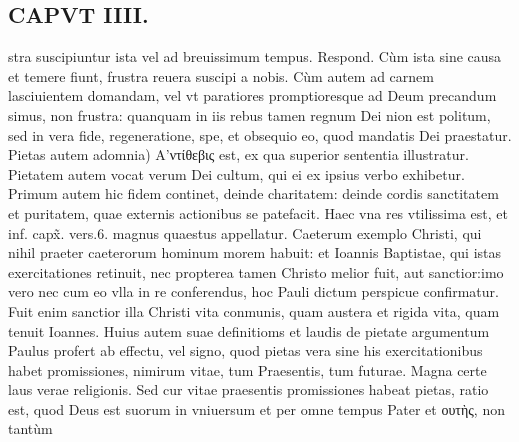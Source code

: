 \documentclass{article}
\begin{document}
\begin{pages}
\section*{CAPVT  IIII. }
\marginpar{[ p.211 ]}\pstart stra suscipiuntur ista vel ad breuissimum tempus. Respond. Cùm ista sine causa et temere fiunt, frustra reuera suscipi a nobis. Cùm autem ad carnem lasciuientem domandam, vel vt paratiores promptioresque ad Deum precandum simus, non frustra: quanquam in iis rebus tamen regnum Dei nion est politum, sed in vera fide, regeneratione, spe, et obsequio eo, quod mandatis Dei praestatur.  \pend\pstart Pietas autem adomnia) Α'ντίθεβις est, ex qua superior sententia illustratur. Pietatem autem vocat verum Dei cultum, qui ei ex ipsius verbo exhibetur. Primum autem hic fidem continet, deinde charitatem: deinde cordis sanctitatem et puritatem, quae externis actionibus se patefacit. Haec vna res vtilissima est, et inf. capx̃. vers.6. magnus quaestus appellatur. Caeterum exemplo Christi, qui nihil praeter caeterorum hominum morem habuit: et Ioannis Baptistae, qui istas exercitationes retinuit, nec propterea tamen Christo melior fuit, aut sanctior:imo vero nec cum eo vlla in re conferendus, hoc Pauli dictum perspicue confirmatur. Fuit enim sanctior illa Christi vita conmunis, quam austera et rigida vita, quam tenuit Ioannes.  \pend\pstart Huius autem suae definitioms et laudis de pietate argumentum Paulus profert ab effectu, vel signo, quod pietas vera sine his exercitationibus habet promissiones, nimirum vitae, tum Praesentis, tum futurae. Magna certe laus verae religionis. Sed cur vitae praesentis promissiones habeat pietas, ratio est, quod Deus est suorum in vniuersum et per omne tempus Pater et ουτὴς, non tantùm  \pend

\end{pages}
\end{document}
